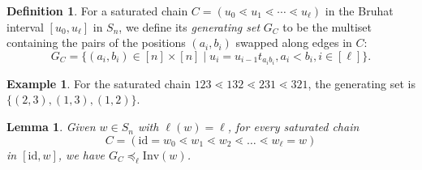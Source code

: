 \documentclass[11pt]{article}
\newtheorem{lemma}[theo]{Lemma}
\theoremstyle{definition}
\newtheorem{defi}[theo]{Definition}
\newtheorem{exam}[theo]{Example}
\numberwithin{equation}{section}
\newcommand{\id}{\mathrm{id}}
\newcommand{\Inv}{\mathrm{Inv}}
\begin{document}
\begin{defi}
    For a saturated chain $C = (u_0 \lessdot u_1\lessdot\cdots \lessdot u_{\ell})$ in the Bruhat interval $[u_0,u_{\ell}]$ in $S_n$,
    we define its \emph{generating set} $G_C$ to be the multiset containing the pairs of the positions $(a_i, b_i)$ swapped along edges in $C$:
    \[G_C = \{(a_i,b_i)\in [n] \times [n]\mid u_{i}=u_{i-1}t_{a_ib_i}, a_i < b_i, i\in[\ell]\}.\]
\end{defi}
\begin{exam}\label{ex:Gc}
    For the saturated chain $123 \lessdot 132 \lessdot 231 \lessdot 321$, the generating set is $\{(2,3), (1,3), (1,2)\}$.
\end{exam}

\begin{lemma}\label{lemma:chainorder}
    Given $w\in S_n$ with $\ell(w) = \ell$, for every saturated chain \[C=(\id=w_0\lessdot w_1\lessdot w_2\lessdot \dots \lessdot w_{\ell} =w)\] in $[\id, w]$, we have
    $G_C\preceq_{\ell} \Inv(w)$.
\end{lemma}
\end{document}
